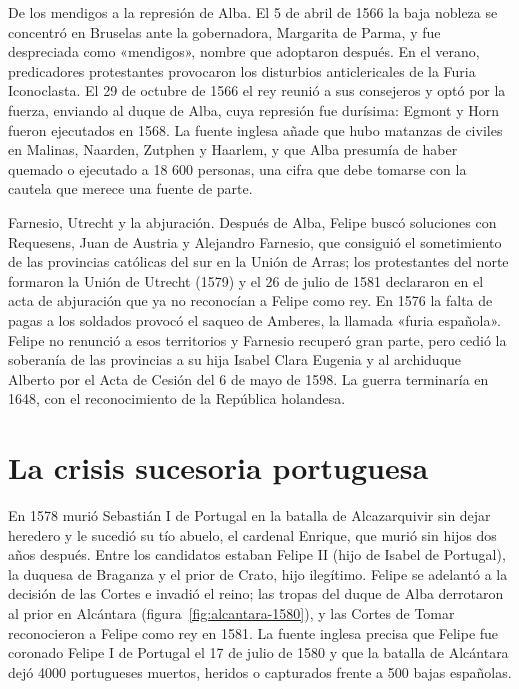 \documentclass{book}
\begin{document}

De los mendigos a la represión de Alba. El 5 de abril de 1566 la baja nobleza se concentró en Bruselas ante la gobernadora, Margarita de Parma, y fue despreciada como «mendigos», nombre que adoptaron después. En el verano, predicadores protestantes provocaron los disturbios anticlericales de la Furia Iconoclasta. El 29 de octubre de 1566 el rey reunió a sus consejeros y optó por la fuerza, enviando al duque de Alba, cuya represión fue durísima: Egmont y Horn fueron ejecutados en 1568. La fuente inglesa añade que hubo matanzas de civiles en Malinas, Naarden, Zutphen y Haarlem, y que Alba presumía de haber quemado o ejecutado a 18 600 personas, una cifra que debe tomarse con la cautela que merece una fuente de parte.


Farnesio, Utrecht y la abjuración. Después de Alba, Felipe buscó soluciones con Requesens, Juan de Austria y Alejandro Farnesio, que consiguió el sometimiento de las provincias católicas del sur en la Unión de Arras; los protestantes del norte formaron la Unión de Utrecht (1579) y el 26 de julio de 1581 declararon en el acta de abjuración que ya no reconocían a Felipe como rey. En 1576 la falta de pagas a los soldados provocó el saqueo de Amberes, la llamada «furia española». Felipe no renunció a esos territorios y Farnesio recuperó gran parte, pero cedió la soberanía de las provincias a su hija Isabel Clara Eugenia y al archiduque Alberto por el Acta de Cesión del 6 de mayo de 1598. La guerra terminaría en 1648, con el reconocimiento de la República holandesa.


\section{La crisis sucesoria portuguesa}

En 1578 murió Sebastián I de Portugal en la batalla de Alcazarquivir sin dejar heredero y le sucedió su tío abuelo, el cardenal Enrique, que murió sin hijos dos años después. Entre los candidatos estaban Felipe II (hijo de Isabel de Portugal), la duquesa de Braganza y el prior de Crato, hijo ilegítimo. Felipe se adelantó a la decisión de las Cortes e invadió el reino; las tropas del duque de Alba derrotaron al prior en Alcántara (figura~\ref{fig:alcantara-1580}), y las Cortes de Tomar reconocieron a Felipe como rey en 1581. La fuente inglesa precisa que Felipe fue coronado Felipe I de Portugal el 17 de julio de 1580 y que la batalla de Alcántara dejó 4000 portugueses muertos, heridos o capturados frente a 500 bajas españolas.
\end{document}
